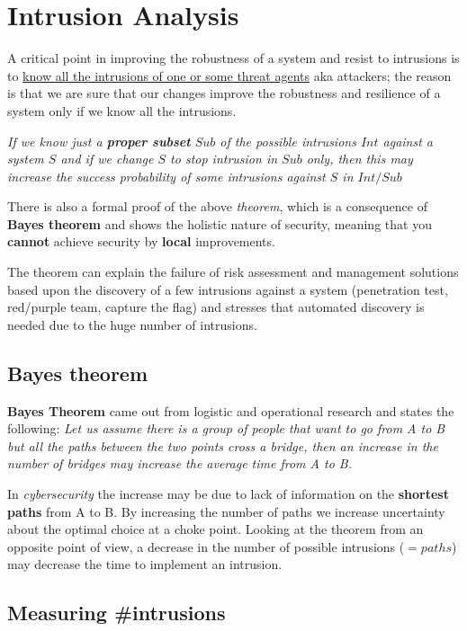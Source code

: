 \chapter{Intrusion Analysis}

A critical point in improving the robustness of a system and resist to intrusions
is to \ul{know all the intrusions of one or some threat agents} aka attackers;
the reason is that we are sure that our changes improve the robustness and
resilience of a system only if we know all the intrusions.

\begin{center}
   \color{gray}
   \textit{If we know just a \textbf{proper subset} $Sub$ of the possible intrusions $Int$ against a system
   $S$ and if we change $S$ to stop intrusion in $Sub$ only, then this may increase the
   success probability of some intrusions against $S$ in $Int / Sub$}
\end{center}
There is also a formal proof of the above \textit{theorem},
which is a consequence of \textbf{Bayes theorem} and shows the holistic nature of
security,
meaning that you \textbf{cannot} achieve security by \textbf{local} improvements.

The theorem can explain the failure of risk assessment and management solutions
based upon the discovery of a few intrusions against a system (penetration test,
red/purple team, capture the flag) and stresses that automated discovery is needed due to the huge number of intrusions.

\section{Bayes theorem}
\textbf{Bayes Theorem} came out from logistic and operational research and states the following:
\emph{Let us assume there is a group of people that want to go from A to B but all the paths between the two points cross a bridge,
then an increase in the number of bridges may increase the
average time from A to B.}

In \textit{cybersecurity} the increase may be due to lack of information on the \textbf{shortest paths} from A to B.
By increasing the number of paths we increase uncertainty
about the optimal choice at a choke point.
Looking at the theorem from an opposite point of view, a decrease in the number of possible
intrusions ($=paths$) may decrease the time to implement an intrusion.

\section{Measuring \#intrusions}

